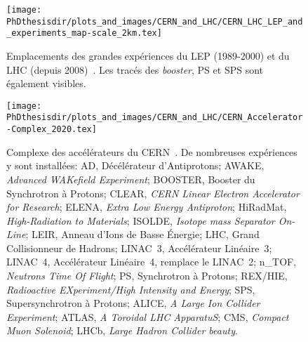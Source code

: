 \begin{figure}[p]
\centering
\texttt{[image: \\PhDthesisdir/plots\_and\_images/CERN\_and\_LHC/CERN\_LHC\_LEP\_and\_experiments\_map-scale\_2km.tex]}
\caption[Emplacements des grandes expériences du LEP et du LHC.]{Emplacements des grandes expériences du LEP (1989-2000) et du LHC (depuis 2008)~\cite{CERN_map}. Les tracés des \emph{booster}, PS et SPS sont également visibles.}
\label{fig-CERN_map}

\vspace{2\baselineskip}

\texttt{[image: \\PhDthesisdir/plots\_and\_images/CERN\_and\_LHC/CERN\_Accelerator-Complex\_2020.tex]}
\caption[Complexe des accélérateurs du CERN.]{Complexe des accélérateurs du CERN~\cite{CERN_website}. 
De nombreuses expériences y sont installées:
AD, Décélérateur d'Antiprotons;
AWAKE, \emph{Advanced WAKefield Experiment};
BOOSTER, Booster du Synchrotron à Protons;
CLEAR, \emph{CERN Linear Electron Accelerator for Research};
ELENA, \emph{Extra Low Energy Antiproton};
HiRadMat, \emph{High-Radiation to Materials};
ISOLDE, \emph{Isotope mass Separator On-Line};
LEIR, Anneau d’Ions de Basse Énergie;
LHC, Grand Collisionneur de Hadrons;
LINAC~3, Accélérateur Linéaire~3;
LINAC~4, Accélérateur Linéaire~4, remplace le LINAC~2;
n\_TOF, \emph{Neutrons Time Of Flight};
PS, Synchrotron à Protons;
REX/HIE, \emph{Radioactive EXperiment/High Intensity and Energy};
SPS, Supersynchrotron à Protons;
ALICE, \emph{A Large Ion Collider Experiment};
ATLAS, \emph{A Toroidal LHC ApparatuS};
CMS, \emph{Compact Muon Solenoid};
LHCb, \emph{Large Hadron Collider beauty}.}
\label{fig-chapter-LHC-section-CERN-CERN_Accelerator-Complex}
\end{figure}